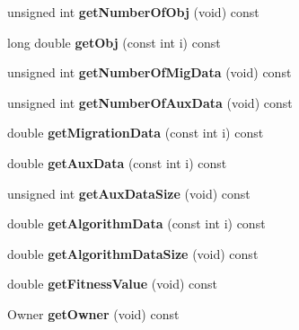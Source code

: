 \begin{DoxyCompactItemize}
\mbox{\label{classIndividual_a2a88ee53411472e3e91ab5b39e618b23}} 
unsigned int {\bfseries get\+Number\+Of\+Obj} (void) const
\item 
\mbox{\label{classIndividual_ad867138d74c6f7ed4a40653acbbe564e}} 
long double {\bfseries get\+Obj} (const int i) const
\item 
\mbox{\label{classIndividual_ac7180dae391a4b76cf7283bb3ae7e0a2}} 
unsigned int {\bfseries get\+Number\+Of\+Mig\+Data} (void) const
\item 
\mbox{\label{classIndividual_a224a48c2975b1c862bb407a20c329ddb}} 
unsigned int {\bfseries get\+Number\+Of\+Aux\+Data} (void) const
\item 
\mbox{\label{classIndividual_aec4b5a16194cc1cd1d8c98c22ee1033d}} 
double {\bfseries get\+Migration\+Data} (const int i) const
\item 
\mbox{\label{classIndividual_a915b5251c26d78bbacd3217b5f0cda5a}} 
double {\bfseries get\+Aux\+Data} (const int i) const
\item 
\mbox{\label{classIndividual_afaefb518f34a0cee32c8cf9f0105ab09}} 
unsigned int {\bfseries get\+Aux\+Data\+Size} (void) const
\item 
\mbox{\label{classIndividual_a4b8c30aeaaf3c718d3ea2d36626dd581}} 
double {\bfseries get\+Algorithm\+Data} (const int i) const
\item 
\mbox{\label{classIndividual_a5d6f94bfb26b12bb814ae33c41d53171}} 
double {\bfseries get\+Algorithm\+Data\+Size} (void) const
\item 
\mbox{\label{classIndividual_acd07ae051e15b48872401de61d888bf3}} 
double {\bfseries get\+Fitness\+Value} (void) const
\item 
\mbox{\label{classIndividual_a4244c72e717c2bb1bfe78c74768da777}} 
Owner {\bfseries get\+Owner} (void) const
\item 
\mbox{\label{classIndividual_aae95dd48e11039b7e721a221316f929a}} 

\end{DoxyCompactItemize}
